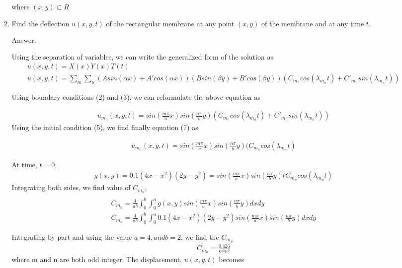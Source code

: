 \documentclass[12pt]{article}
\begin{document}
\begin{enumerate}[{\bf I.}]
\begin{enumerate}
where $(x,y) \subset R$



\item Find the deflection $u(x,y,t)$ of the rectangular membrane at any point $(x,y)$ of the membrane and at any time $t$.  



 Answer:
 
 Using the separation of variables, we can write the generalized form of the solution as 
 \begin{align}
 \nonumber
 u(x,y,t) = X(x)Y(x)T(t)
 \\ u(x,y,t) = \sum_m \sum_n (Asin(\alpha x) + A'cos(\alpha x))(Bsin(\beta y) + B'cos(\beta y))(C_m_ncos(\lambda_m_nt) + C'_m_nsin(\lambda_m_nt))
 \end{align}
 
 Using boundary conditions (2) and (3), we can reformulate the above equation as
 
 \begin{align}
 u_m_n(x,y,t) = sin(\frac{m\pi}{a}x) sin(\frac{n\pi}{b}y)(C_m_ncos(\lambda_m_nt) + C'_m_n sin(\lambda_m_nt))
 \end{align}
 Using the initial condition (5), we find finally equation (7) as
 
 \begin{align}
 u_m_n(x,y,t) = sin(\frac{m\pi}{a}x) sin(\frac{n\pi}{b}y)(C_m_ncos(\lambda_m_nt)
 \end{align}
 
 At time, $ t=0 $,
 \begin{align}
 g(x,y) = 0.1(4x - x^2)(2y - y^2)  = sin(\frac{m\pi}{a}x) sin(\frac{n\pi}{b}y)(C_m_ncos(\lambda_m_nt)
 \end{align}
 Integrating both sides, we find value of $C_m_n$,
 \begin{align}
 \\C_m_n = \frac{4}{ab} \int_{0}^{b} \int_{0}^{a} g(x,y) sin(\frac{m\pi}{a}x) sin(\frac{n\pi}{b}y)dxdy
 
 \\C_m_n = \frac{4}{ab} \int_{0}^{b} \int_{0}^{a} 0.1(4x - x^2)(2y - y^2) sin(\frac{m\pi}{a}x) sin(\frac{n\pi}{b}y)dxdy  
 \end{align}
 
 Integrating by part and using the value $a=4, and b =2 $, we find the $C_m_n$
 \begin{align}
 C_m_n = \frac{0.426}{m^3n^3}
 \end{align}
 where m and n are both odd integer. The displacement, $u(x,y,t)$ becomes
 

\end{enumerate}
\end{enumerate}
\end{document}
